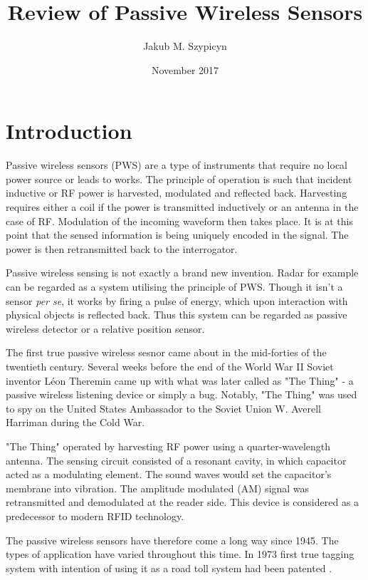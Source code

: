 \documentclass[11pt,a4paper]{article}
\begin{document}
\title{Review of Passive Wireless Sensors}
\author{Jakub M. Szypicyn}
\date{November 2017}
\maketitle
\tableofcontents
\pagebreak
\section{Introduction}

Passive wireless sensors (PWS) are a type of instruments that require no local power source or leads to works. The principle of operation is such that incident inductive or RF power is harvested, modulated and reflected back. Harvesting requires either a coil if the power is transmitted inductively or an antenna in the case of RF. Modulation of the incoming waveform then takes place. It is at this point that the sensed information is being uniquely encoded in the signal. The power is then retransmitted back to the interrogator.

Passive wireless sensing is not exactly a brand new invention. Radar for example can be regarded as a system utilising the principle of PWS. Though it isn't a sensor \textit{per se}, it works by firing a pulse of energy, which upon interaction with physical objects is reflected back. Thus this system can be regarded as passive wireless detector or a relative position sensor.

The first true passive wireless sesnor came about in the mid-forties of the twentieth century. Several weeks before the end of the World War II Soviet inventor Léon Theremin came up with what was later called as "The Thing" - a passive wireless listening device or simply a bug. Notably, "The Thing" was used to spy on the United States Ambassador to the Soviet Union W. Averell Harriman during the Cold War. 

"The Thing" operated by harvesting RF power using a quarter-wavelength antenna. The sensing circuit consisted of a resonant cavity, in which capacitor acted as a modulating element. The sound waves would set the capacitor's membrane into vibration. The amplitude modulated (AM) signal was retransmitted and demodulated at the reader side. This device is considered as a predecessor to modern RFID technology\cite{thing}.

The passive wireless sensors have therefore come a long way since 1945. The types of application have varied throughout this time. In 1973 first true tagging system with intention of using it as a road toll system had been patented \cite{toll}.
\end{document}
